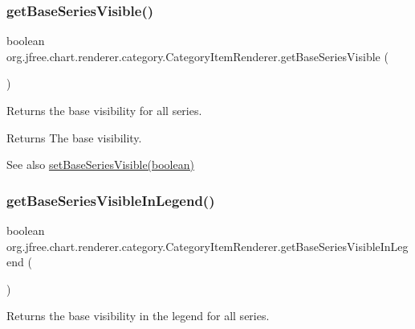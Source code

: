 \subsubsection{\texorpdfstring{get\+Base\+Series\+Visible()}{getBaseSeriesVisible()}}
{\footnotesize\ttfamily boolean org.\+jfree.\+chart.\+renderer.\+category.\+Category\+Item\+Renderer.\+get\+Base\+Series\+Visible (\begin{DoxyParamCaption}{ }\end{DoxyParamCaption})}

Returns the base visibility for all series.

\begin{DoxyReturn}{Returns}
The base visibility.
\end{DoxyReturn}
\begin{DoxySeeAlso}{See also}
\mbox{\hyperlink{interfaceorg_1_1jfree_1_1chart_1_1renderer_1_1category_1_1_category_item_renderer_a5f2b5280274a015095a855e988ae1fe1}{set\+Base\+Series\+Visible(boolean)}} 
\end{DoxySeeAlso}
\mbox{\label{interfaceorg_1_1jfree_1_1chart_1_1renderer_1_1category_1_1_category_item_renderer_a5dbb34f875d6bbd46e99e3ec0d06f27c}} 
\subsubsection{\texorpdfstring{get\+Base\+Series\+Visible\+In\+Legend()}{getBaseSeriesVisibleInLegend()}}
{\footnotesize\ttfamily boolean org.\+jfree.\+chart.\+renderer.\+category.\+Category\+Item\+Renderer.\+get\+Base\+Series\+Visible\+In\+Legend (\begin{DoxyParamCaption}{ }\end{DoxyParamCaption})}

Returns the base visibility in the legend for all series.

